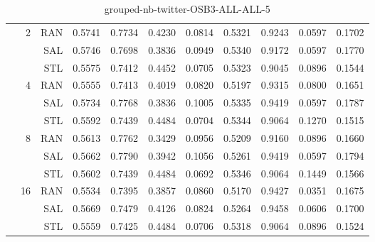 \begin{center}
\begin{table}[htbp]
\begin{center}
\begin{tabular}{ | r | r | r | r | r | r | r | r | r | r | r |}
 & \multirow{3}{*}{2} & RAN & 0.5741 & 0.7734 & 0.4230 & 0.0814 & 0.5321 & 0.9243 & 0.0597 & 0.1702\\ \cline{3-11}
 &   & SAL & 0.5746 & 0.7698 & 0.3836 & 0.0949 & 0.5340 & 0.9172 & 0.0597 & 0.1770\\ \cline{3-11}
 &   & STL & 0.5575 & 0.7412 & 0.4452 & 0.0705 & 0.5323 & 0.9045 & 0.0896 & 0.1544\\ \cline{2-11}
 & \multirow{3}{*}{4} & RAN & 0.5555 & 0.7413 & 0.4019 & 0.0820 & 0.5197 & 0.9315 & 0.0800 & 0.1651\\ \cline{3-11}
 &   & SAL & 0.5734 & 0.7768 & 0.3836 & 0.1005 & 0.5335 & 0.9419 & 0.0597 & 0.1787\\ \cline{3-11}
 &   & STL & 0.5592 & 0.7439 & 0.4484 & 0.0704 & 0.5344 & 0.9064 & 0.1270 & 0.1515\\ \cline{2-11}
 & \multirow{3}{*}{8} & RAN & 0.5613 & 0.7762 & 0.3429 & 0.0956 & 0.5209 & 0.9160 & 0.0896 & 0.1660\\ \cline{3-11}
 &   & SAL & 0.5662 & 0.7790 & 0.3942 & 0.1056 & 0.5261 & 0.9419 & 0.0597 & 0.1794\\ \cline{3-11}
 &   & STL & 0.5602 & 0.7439 & 0.4484 & 0.0692 & 0.5346 & 0.9064 & 0.1449 & 0.1566\\ \cline{2-11}
 & \multirow{3}{*}{16} & RAN & 0.5534 & 0.7395 & 0.3857 & 0.0860 & 0.5170 & 0.9427 & 0.0351 & 0.1675\\ \cline{3-11}
 &   & SAL & 0.5669 & 0.7479 & 0.4126 & 0.0824 & 0.5264 & 0.9458 & 0.0606 & 0.1700\\ \cline{3-11}
 &   & STL & 0.5559 & 0.7425 & 0.4484 & 0.0706 & 0.5318 & 0.9064 & 0.0896 & 0.1524\\ \cline{2-11}
\hline
\end{tabular}
\caption{grouped-nb-twitter-OSB3-ALL-ALL-5}
\end{center}
 \end{table}
\end{center}

